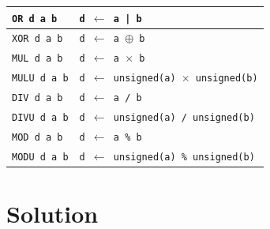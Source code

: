 \documentclass[table]{beamer}
\begin{document}
\begin{frame}[fragile]
\begin{table}
\begin{tabular}{|l|l|}
	\rowcolor{Gray} \texttt{OR d a b} & \texttt{d $\leftarrow$ a | b}\\ \hline
	\rowcolor{Gray} \texttt{XOR d a b} & \texttt{d $\leftarrow$ a $\oplus$ b}\\ \hline
	\texttt{MUL d a b} & \texttt{d $\leftarrow$ a $\times$ b}\\ \hline
	\rowcolor{Gray} \texttt{MULU d a b} & \texttt{d $\leftarrow$ unsigned(a) $\times$ unsigned(b)}\\ \hline
	\texttt{DIV d a b} & \texttt{d $\leftarrow$ a / b}\\ \hline
	\rowcolor{Gray} \texttt{DIVU d a b} & \texttt{d $\leftarrow$ unsigned(a) / unsigned(b)}\\ \hline
	\texttt{MOD d a b} & \texttt{d $\leftarrow$ a \% b}\\ \hline
	\rowcolor{Gray} \texttt{MODU d a b} & \texttt{d $\leftarrow$ unsigned(a) \% unsigned(b)}\\ \hline
	\end{tabular}
  \end{table}
\end{frame}

    

\section{Solution} %
\end{document}

